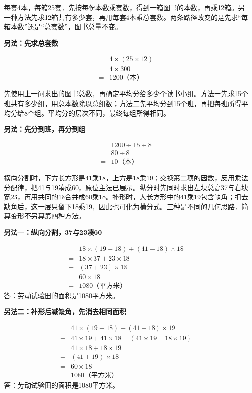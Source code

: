 \documentclass[multi=snippet,border=0pt]{standalone}
\newenvironment{snippet}[3]{\begin{minipage}{#1bp}\color{answerred}\fontsize{#2}{#3}\selectfont\raggedright}{\end{minipage}}
\begin{document}
\begin{snippet}{505}{11.5}{14}每套4本，每箱25套，先按每份本数乘套数，得到一箱图书的本数，再乘12箱。另一种方法先求12箱共有多少套，再用每套4本乘总套数。两条路径改变的是先求“每箱本数”还是“总套数”，图书总量不变。\par \textbf{另法：先求总套数}\par \[\begin{aligned} &4\times(25\times12)\\={}&4\times300\\={}&1200\text{（本）}\end{aligned}\]\end{snippet}
\begin{snippet}{505}{11.5}{14}先使用上一问求出的图书总数，再确定平均分给多少个读书小组。方法一先求15个班共有多少组，用总本数除以总组数；方法二先平均分到15个班，再把每班所得平均分给8个组。平均分的层次不同，最终每组所得相同。\par \textbf{另法：先分到班，再分到组}\par \[\begin{aligned} &1200\div15\div8\\={}&80\div8\\={}&10\text{（本）}\end{aligned}\]\end{snippet}
\begin{snippet}{505}{11.5}{14}横向分割时，下方长方形是41乘18，上方是18乘19；交换第二项的因数，反用乘法分配律，把41与19凑成60，原位主法已展示。纵分时先同时求出左块总高37与右块宽23，再用共同的18合并成60乘18。补形时，大长方形中的41乘19包含缺角；扣去缺角后，这一层只留下18乘19，因此也可化为横分式。三种是不同的几何思路，简算变形不另算第四种方法。\par \textbf{另法一：纵向分割，37与23凑60}\par \[\begin{aligned}&18\times(19+18)+(41-18)\times18\\={}&18\times37+23\times18\\={}&(37+23)\times18\\={}&60\times18\\={}&1080\text{（平方米）}\end{aligned}\]答：劳动试验田的面积是1080平方米。\par \textbf{另法二：补形后减缺角，先消去相同面积}\par \[\begin{aligned}&41\times(19+18)-(41-18)\times19\\={}&41\times19+41\times18-(41\times19-18\times19)\\={}&41\times18+18\times19\\={}&(41+19)\times18\\={}&60\times18\\={}&1080\text{（平方米）}\end{aligned}\]答：劳动试验田的面积是1080平方米。\end{snippet}
\end{document}
